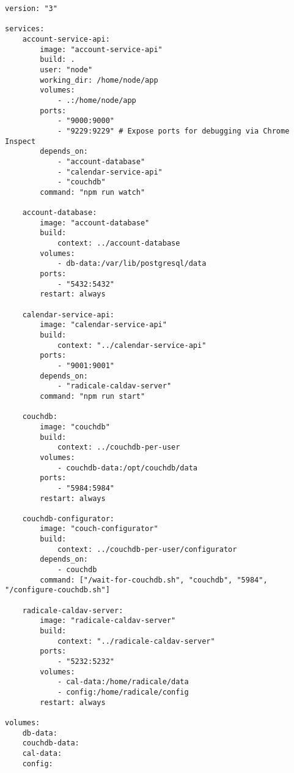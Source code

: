 \begin{verbatim}
version: "3"

services:
    account-service-api:
        image: "account-service-api"
        build: .
        user: "node"
        working_dir: /home/node/app
        volumes:
            - .:/home/node/app
        ports:
            - "9000:9000"
            - "9229:9229" # Expose ports for debugging via Chrome Inspect
        depends_on:
            - "account-database"
            - "calendar-service-api"
            - "couchdb"
        command: "npm run watch"

    account-database:
        image: "account-database"
        build:
            context: ../account-database
        volumes:
            - db-data:/var/lib/postgresql/data
        ports:
            - "5432:5432"
        restart: always

    calendar-service-api:
        image: "calendar-service-api"
        build:
            context: "../calendar-service-api"
        ports:
            - "9001:9001"
        depends_on:
            - "radicale-caldav-server"
        command: "npm run start"

    couchdb:
        image: "couchdb"
        build:
            context: ../couchdb-per-user
        volumes:
            - couchdb-data:/opt/couchdb/data
        ports:
            - "5984:5984"
        restart: always

    couchdb-configurator:
        image: "couch-configurator"
        build:
            context: ../couchdb-per-user/configurator
        depends_on:
            - couchdb
        command: ["/wait-for-couchdb.sh", "couchdb", "5984", "/configure-couchdb.sh"]

    radicale-caldav-server:
        image: "radicale-caldav-server"
        build:
            context: "../radicale-caldav-server"
        ports:
            - "5232:5232"
        volumes:
            - cal-data:/home/radicale/data
            - config:/home/radicale/config
        restart: always

volumes:
    db-data:
    couchdb-data:
    cal-data:
    config:
\end{verbatim}
